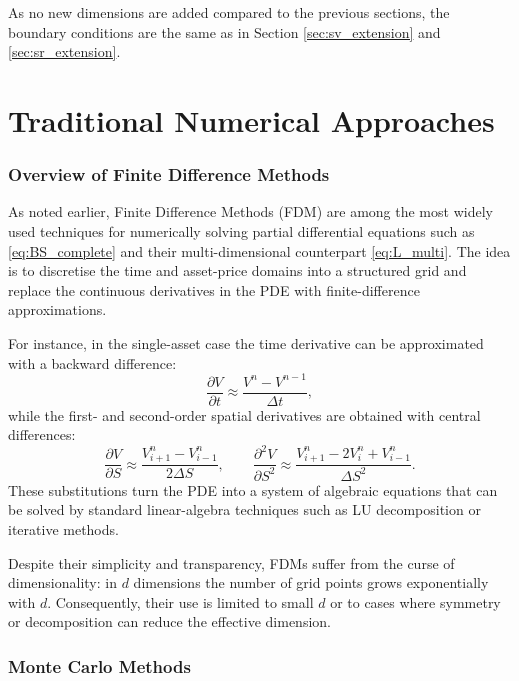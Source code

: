 \documentclass[12pt]{report} %
\theoremstyle{plain}           %
\theoremstyle{definition}      %
\theoremstyle{remark}          %
\begin{document}
As no new dimensions are added compared to the previous sections, the boundary conditions are the same as 
in Section \ref{sec:sv_extension} and \ref{sec:sr_extension}.
\section{Traditional Numerical Approaches}
\subsubsection{Overview of Finite Difference Methods}
As noted earlier, Finite Difference Methods (FDM) are among the most widely used
techniques for numerically solving partial differential equations such as
\eqref{eq:BS_complete} and their multi-dimensional counterpart
\eqref{eq:L_multi}.  The idea is to discretise the time and asset-price domains
into a structured grid and replace the continuous derivatives in the PDE with
finite-difference approximations.

For instance, in the single-asset case the time derivative can be approximated
with a backward difference:
\[
  \frac{\partial V}{\partial t} \approx \frac{V^{n}-V^{n-1}}{\Delta t},
\]
while the first- and second-order spatial derivatives are obtained with central
differences:
\[
  \frac{\partial V}{\partial S} \approx
    \frac{V_{i+1}^{n}-V_{i-1}^{n}}{2\Delta S},
  \qquad
  \frac{\partial^{2}V}{\partial S^{2}} \approx
    \frac{V_{i+1}^{n}-2V_{i}^{n}+V_{i-1}^{n}}{\Delta S^{2}}.
\]
These substitutions turn the PDE into a system of algebraic equations that can
be solved by standard linear-algebra techniques such as LU decomposition or
iterative methods.

Despite their simplicity and transparency, FDMs suffer from the curse of
dimensionality: in \(d\) dimensions the number of grid points grows
exponentially with \(d\).  Consequently, their use is limited to small \(d\) or
to cases where symmetry or decomposition can reduce the effective dimension.

\subsubsection{Monte Carlo Methods}
\end{document}

